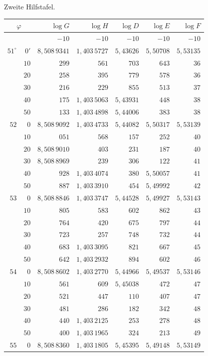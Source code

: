 \begin{center}
Zweite Hilfstafel.\par\medskip
\begingroup\small\setlength{\tabcolsep}{5pt}\renewcommand{\arraystretch}{1.08}
\begin{tabular}{|r@{\;}r|r|r|r|r|r|}
\hline
\multicolumn{2}{|c|}{$\varphi$}&$\log G$&$\log H$&$\log D$&$\log E$&$\log F$\\\hline\hline
&&$-10$&$-10$&$-10$&$-10$&$-10$\\
$51^\circ$&$0'$&$8{,}508\,9341$&$1{,}403\,5727$&$5{,}43626$&$5{,}50708$&$5{,}53135$\\
&$10$&$299$&$561$&$703$&$643$&$36$\\
&$20$&$258$&$395$&$779$&$578$&$36$\\
&$30$&$216$&$229$&$855$&$513$&$37$\\
&$40$&$175$&$1{,}403\,5063$&$5{,}43931$&$448$&$38$\\
&$50$&$133$&$1{,}403\,4898$&$5{,}44006$&$383$&$38$\\\hline
$52$&$0$&$8{,}508\,9092$&$1{,}403\,4733$&$5{,}44082$&$5{,}50317$&$5{,}53139$\\
&$10$&$051$&$568$&$157$&$252$&$40$\\
&$20$&$8{,}508\,9010$&$403$&$231$&$187$&$40$\\
&$30$&$8{,}508\,8969$&$239$&$306$&$122$&$41$\\
&$40$&$928$&$1{,}403\,4074$&$380$&$5{,}50057$&$41$\\
&$50$&$887$&$1{,}403\,3910$&$454$&$5{,}49992$&$42$\\\hline
$53$&$0$&$8{,}508\,8846$&$1{,}403\,3747$&$5{,}44528$&$5{,}49927$&$5{,}53143$\\
&$10$&$805$&$583$&$602$&$862$&$43$\\
&$20$&$764$&$420$&$675$&$797$&$44$\\
&$30$&$723$&$257$&$748$&$732$&$44$\\
&$40$&$683$&$1{,}403\,3095$&$821$&$667$&$45$\\
&$50$&$642$&$1{,}403\,2932$&$894$&$602$&$46$\\\hline
$54$&$0$&$8{,}508\,8602$&$1{,}403\,2770$&$5{,}44966$&$5{,}49537$&$5{,}53146$\\
&$10$&$561$&$609$&$5{,}45038$&$472$&$47$\\
&$20$&$521$&$447$&$110$&$407$&$47$\\
&$30$&$481$&$286$&$182$&$342$&$48$\\
&$40$&$440$&$1{,}403\,2125$&$253$&$278$&$48$\\
&$50$&$400$&$1{,}403\,1965$&$324$&$213$&$49$\\\hline
$55$&$0$&$8{,}508\,8360$&$1{,}403\,1805$&$5{,}45395$&$5{,}49148$&$5{,}53149$\\
\end{tabular}\par\endgroup
\end{center}
